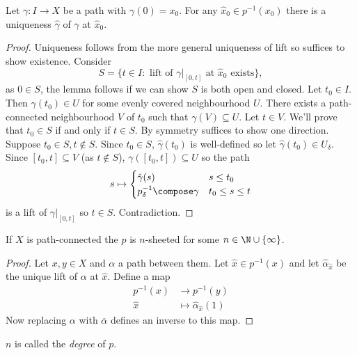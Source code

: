 \documentclass[a4paper]{article}
\begin{document}
\begin{lemma}
  Let \(\gamma: I \to X\) be a path with \(\gamma(0) = x_0\). For any \(\hat x_0 \in p^{-1}(x_0)\) there is a uniqueness \(\hat \gamma\) of \(\gamma\) at \(\hat x_0\).
\end{lemma}

\begin{proof}
  Uniqueness follows from the more general uniqueness of lift so suffices to show existence. Consider
  \[
    S = \{t \in I: \text{ lift of } \gamma|_{[0, t]} \text{ at } \hat x_0 \text{ exists}\},
  \]
  as \(0 \in S\), the lemma follows if we can show \(S\) is both open and closed. Let \(t_0 \in I\). Then \(\gamma(t_0) \in U\) for some evenly covered neighbourhood \(U\). There exists a path-connected neighbourhood \(V\) of \(t_0\) such that \(\gamma(V) \subseteq U\). Let \(t \in V\). We'll prove that \(t_0 \in S\) if and only if \(t \in S\). By symmetry suffices to show one direction. Suppose \(t_0 \in S, t \notin S\). Since \(t_0 \in S\), \(\hat \gamma(t_0)\) is well-defined so let \(\hat \gamma(t_0) \in U_\delta\). Since \([t_0, t] \subseteq V\) (as \(t \notin S\)), \(\gamma([t_0, t]) \subseteq U\) so the path
  \[
    s \mapsto
    \begin{cases}
      \hat \gamma(s) & s \leq t_0 \\
      p_\delta^{-1} \compose \gamma & t_0 \leq s \leq t
    \end{cases}
  \]
  is a lift of \(\gamma|_{[0, t]}\) so \(t \in S\). Contradiction.
\end{proof}

\begin{lemma}
  If \(X\) is path-connected the \(p\) is \(n\)-sheeted for some \(n \in \N \cup \{\infty\}\).
\end{lemma}

\begin{proof}
  Let \(x, y \in X\) and \(\alpha\) a path between them. Let \(\hat x \in p^{-1}(x)\) and let \(\hat \alpha_{\hat x}\) be the unique lift of \(\alpha\) at \(\hat x\). Define a map
  \begin{align*}
    p^{-1} (x) &\to p^{-1}(y) \\
    \hat x &\mapsto \hat \alpha_{\hat x}(1)
  \end{align*}
  Now replacing \(\alpha\) with \(\overline \alpha\) defines an inverse to this map.
\end{proof}

\begin{definition}
  \(n\) is called the \emph{degree} of \(p\).
\end{definition}
\end{document}
